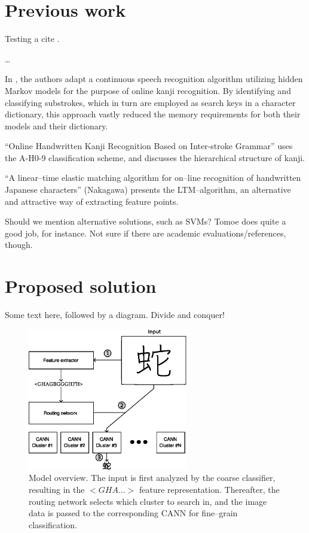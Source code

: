 \documentclass[10pt,conference,a4paper]{IEEEtran}
\begin{document}
	 
	\section{Previous work}

	Testing a cite \cite{zhu2014robust}.

	\ldots

	In \cite{nakai2001substroke}, the authors adapt a continuous speech recognition algorithm utilizing
	hidden Markov models for the purpose of online kanji recognition. By identifying and classifying
	substrokes, which in turn are employed as search keys in a character dictionary, this approach vastly
	reduced the memory requirements for both their models and their dictionary.


	``Online Handwritten Kanji Recognition Based on Inter-stroke Grammar'' uses the A-H0-9 classification scheme,
	and discusses the hierarchical structure of kanji.

	``A linear--time elastic matching algorithm for on--line recognition of handwritten Japanese characters'' (Nakagawa)
	presents the LTM--algorithm, an alternative and attractive way of extracting feature points.

	Should we mention alternative solutions, such as SVMs? Tomoe does quite a good job, for instance. Not sure if there
	are academic evaluations/references, though.



	\section{Proposed solution}

	Some text here, followed by a diagram. Divide and conquer!

	\begin{figure}
		\centering
		\includegraphics[width=2.75in]{./fig/model-overview.eps}
		\caption{Model overview. The input is first analyzed by the coarse classifier, resulting in the $<GHA\ldots>$ feature representation.
		Thereafter, the routing network selects which cluster to search in, and the image data is passed to the corresponding CANN for fine--grain classification.}
		\label{fig_model_overview}
	\end{figure}
\end{document}

